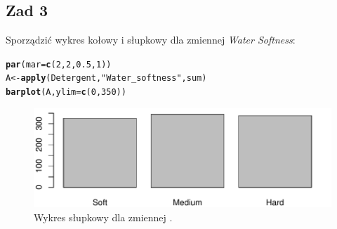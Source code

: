 \documentclass[12pt]{mwart}\usepackage[]{graphicx}\usepackage[]{color}
\makeatletter
\def\maxwidth{ %
  \ifdim\Gin@nat@width>\linewidth
    \linewidth
  \else
    \Gin@nat@width
  \fi
}
\newcommand{\hlnum}[1]{\textcolor[rgb]{0.686,0.059,0.569}{#1}}%
\newcommand{\hlstr}[1]{\textcolor[rgb]{0.192,0.494,0.8}{#1}}%
\newcommand{\hlstd}[1]{\textcolor[rgb]{0.345,0.345,0.345}{#1}}%
\newcommand{\hlkwb}[1]{\textcolor[rgb]{0.69,0.353,0.396}{#1}}%
\newcommand{\hlkwc}[1]{\textcolor[rgb]{0.333,0.667,0.333}{#1}}%
\newcommand{\hlkwd}[1]{\textcolor[rgb]{0.737,0.353,0.396}{\textbf{#1}}}%
\newenvironment{kframe}{%
 \def\at@end@of@kframe{}%
 \ifinner\ifhmode%
  \def\at@end@of@kframe{\end{minipage}}%
  \begin{minipage}{\columnwidth}%
 \fi\fi%
 \def\FrameCommand##1{\hskip\@totalleftmargin \hskip-\fboxsep
 \colorbox{shadecolor}{##1}\hskip-\fboxsep
     \hskip-\linewidth \hskip-\@totalleftmargin \hskip\columnwidth}%
 \MakeFramed {\advance\hsize-\width
   \@totalleftmargin\z@ \linewidth\hsize
   \@setminipage}}%
 {\par\unskip\endMakeFramed%
 \at@end@of@kframe}
\newenvironment{knitrout}{}{} %
\makeatother
\begin{document}
\subsection*{Zad 3}
Sporządzić wykres kołowy i słupkowy dla zmiennej \textit{Water Softness}:
\begin{knitrout}
\color{fgcolor}\begin{kframe}
\begin{alltt}
\hlkwd{par}\hlstd{(}\hlkwc{mar} \hlstd{=} \hlkwd{c}\hlstd{(}\hlnum{2}\hlstd{,} \hlnum{2}\hlstd{,} \hlnum{0.5}\hlstd{,} \hlnum{1}\hlstd{))}
\hlstd{A} \hlkwb{<-} \hlkwd{apply}\hlstd{(Detergent,} \hlstr{"Water_softness"}\hlstd{, sum)}
\hlkwd{barplot}\hlstd{(A,}\hlkwc{ylim}\hlstd{=}\hlkwd{c}\hlstd{(}\hlnum{0}\hlstd{,}\hlnum{350}\hlstd{))}
\end{alltt}
\end{kframe}\begin{figure}[H]
\includegraphics[width=\maxwidth]{figure/fig_1-1} \caption{\label{fig:1}Wykres słupkowy dla zmiennej .}\label{fig:fig_1}
\end{figure}

\end{knitrout}
\end{document}
